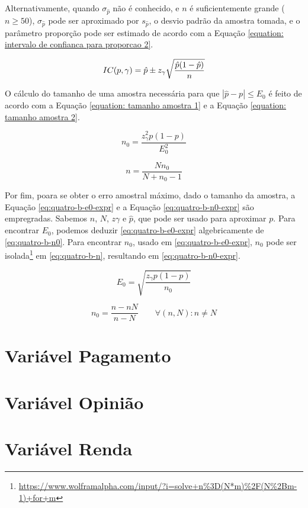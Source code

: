 \documentclass[10pt,a4paper,oneside]{article}
\begin{document}
	Alternativamente, quando $\sigma_{\hat{p}}$ não é conhecido, e $n$ é
	suficientemente grande ($n \geq 50$), $\sigma_{\hat{p}}$ pode
	ser aproximado por $s_{\hat{p}}$, o desvio padrão da amostra tomada, e o
	parâmetro proporção pode ser estimado de acordo com a Equação
	\ref{equation: intervalo de confianca para proporcao 2}.

		\begin{equation}
			IC(p, \gamma) = \hat{p} \pm z_\gamma \sqrt{\frac{\hat{p}(1-\hat{p})}{n}} \\
			\label{equation: intervalo de confianca para proporcao 2}
		\end{equation}
	
	O cálculo do tamanho de uma amostra necessária para que $|\hat{p} - p|
	\leq E_0$ é feito de acordo com a Equação \ref{equation: tamanho amostra
	1} e a Equação \ref{equation: tamanho amostra 2}.

	\begin{equation}
		n_0 = \frac{z_\gamma^2 p(1-p)}{E_0^2}
		\label{equation: tamanho amostra 1}
	\end{equation}

	\begin{equation}
		n = \frac{N n_0}{N + n_0 - 1}
		\label{equation: tamanho amostra 2}
	\end{equation}

	Por fim, poara se obter o erro amostral máximo, dado o tamanho da
	amostra, a Equação \eqref{eq:quatro-b-e0-expr} e a Equação
	\eqref{eq:quatro-b-n0-expr} são empregradas. Sabemos $n$, $N$, $z\gamma$
	e $\hat{p}$, que pode ser usado para aproximar $p$. Para encontrar
	$E_0$, podemos deduzir \eqref{eq:quatro-b-e0-expr} algebricamente de
	\eqref{eq:quatro-b-n0}.  Para encontrar $n_0$, usado em
	\eqref{eq:quatro-b-e0-expr}, $n_0$ pode ser
	isolada\footnote{\url{https://www.wolframalpha.com/input/?i=solve+n\%3D(N*m)\%2F(N\%2Bm-1)+for+m}}
	em \eqref{eq:quatro-b-n}, resultando em \eqref{eq:quatro-b-n0-expr}. 

	\begin{equation}
		E_0 = \sqrt{\frac{z_\gamma p(1 - p) }{n_0}}
		\label{equation: erro amostral maximo}
	\end{equation}

	\begin{equation}
		n_0 = \frac{n-n N}{n-N} \qquad \forall (n, N) : n \neq N
	\label{equation: tamanho amostral maximo}
	\end{equation}

\section{Variável Pagamento}
\label{questao:4}


\section{Variável Opinião}
\label{questao:5}


\section{Variável Renda}
\label{questao:6}

\end{document}

